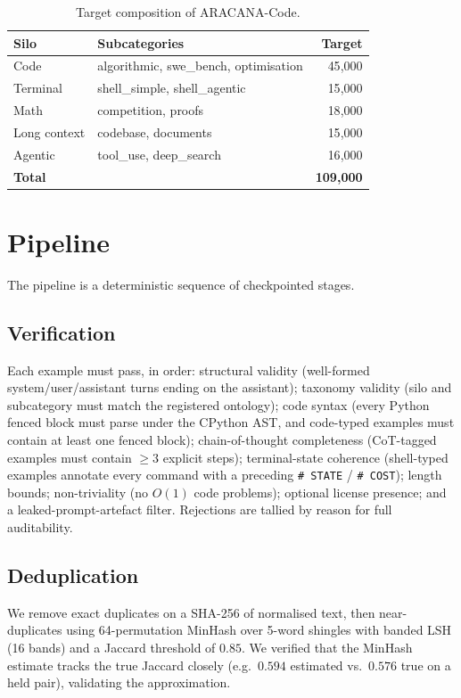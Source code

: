 \documentclass[11pt]{article}
\begin{document}
\begin{table}[h]
\centering
\begin{tabular}{llr}
\toprule
Silo & Subcategories & Target \\
\midrule
Code          & algorithmic, swe\_bench, optimisation & 45{,}000 \\
Terminal      & shell\_simple, shell\_agentic         & 15{,}000 \\
Math          & competition, proofs                   & 18{,}000 \\
Long context  & codebase, documents                   & 15{,}000 \\
Agentic       & tool\_use, deep\_search               & 16{,}000 \\
\midrule
\textbf{Total} & & \textbf{109{,}000} \\
\bottomrule
\end{tabular}
\caption{Target composition of ARACANA-Code.}
\label{tab:silos}
\end{table}

\section{Pipeline}
The pipeline is a deterministic sequence of checkpointed stages.

\subsection{Verification}
Each example must pass, in order: structural validity (well-formed
system/user/assistant turns ending on the assistant); taxonomy validity (silo
and subcategory must match the registered ontology); code syntax (every Python
fenced block must parse under the CPython AST, and code-typed examples must
contain at least one fenced block); chain-of-thought completeness (CoT-tagged
examples must contain $\geq 3$ explicit steps); terminal-state coherence
(shell-typed examples annotate every command with a preceding
\texttt{\# STATE} / \texttt{\# COST}); length bounds; non-triviality (no
$O(1)$ code problems); optional license presence; and a leaked-prompt-artefact
filter. Rejections are tallied by reason for full auditability.

\subsection{Deduplication}
We remove exact duplicates on a SHA-256 of normalised text, then near-duplicates
using 64-permutation MinHash over 5-word shingles with banded LSH (16 bands)
and a Jaccard threshold of $0.85$. We verified that the MinHash estimate tracks
the true Jaccard closely (e.g.\ $0.594$ estimated vs.\ $0.576$ true on a held
pair), validating the approximation.
\end{document}

